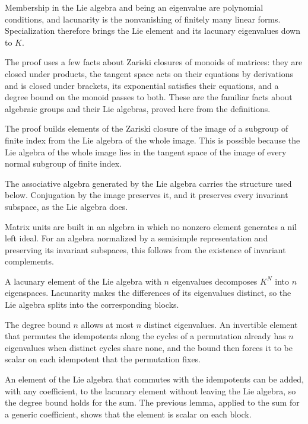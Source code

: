 Membership in the Lie algebra and being an eigenvalue are polynomial conditions, and lacunarity is the
nonvanishing of finitely many linear forms. Specialization therefore brings the Lie element and its
lacunary eigenvalues down to $K$.

The proof uses a few facts about Zariski closures of monoids of matrices: they are closed under
products, the tangent space acts on their equations by derivations and is closed under brackets, its
exponential satisfies their equations, and a degree bound on the monoid passes to both. These are the
familiar facts about algebraic groups and their Lie algebras, proved here from the definitions.

The proof builds elements of the Zariski closure of the image of a subgroup of finite index from the
Lie algebra of the whole image. This is possible because the Lie algebra of the whole image lies in
the tangent space of the image of every normal subgroup of finite index.

The associative algebra generated by the Lie algebra carries the structure used below. Conjugation by
the image preserves it, and it preserves every invariant subspace, as the Lie algebra does.

Matrix units are built in an algebra in which no nonzero element generates a nil left ideal. For an
algebra normalized by a semisimple representation and preserving its invariant subspaces, this follows
from the existence of invariant complements.

A lacunary element of the Lie algebra with $n$ eigenvalues decomposes $K^N$ into $n$ eigenspaces.
Lacunarity makes the differences of its eigenvalues distinct, so the Lie algebra splits into the
corresponding blocks.

The degree bound $n$ allows at most $n$ distinct eigenvalues. An invertible element that permutes the
idempotents along the cycles of a permutation already has $n$ eigenvalues when distinct cycles share
none, and the bound then forces it to be scalar on each idempotent that the permutation fixes.

An element of the Lie algebra that commutes with the idempotents can be added, with any coefficient,
to the lacunary element without leaving the Lie algebra, so the degree bound holds for the sum. The
previous lemma, applied to the sum for a generic coefficient, shows that the element is scalar on each
block.

